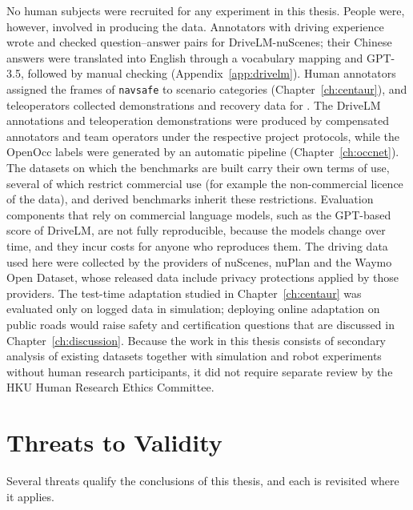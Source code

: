 No human subjects were recruited for any experiment in this thesis. People were, however, involved in producing the data. Annotators with driving experience wrote and checked question--answer pairs for DriveLM-nuScenes; their Chinese answers were translated into English through a vocabulary mapping and GPT-3.5, followed by manual checking (Appendix~\ref{app:drivelm}). Human annotators assigned the frames of \texttt{navsafe} to scenario categories (Chapter~\ref{ch:centaur}), and teleoperators collected demonstrations and recovery data for \chiz. The DriveLM annotations and \chiz teleoperation demonstrations were produced by compensated annotators and team operators under the respective project protocols, while the OpenOcc labels were generated by an automatic pipeline (Chapter~\ref{ch:occnet}). The datasets on which the benchmarks are built carry their own terms of use, several of which restrict commercial use (for example the non-commercial licence of the \chiz data), and derived benchmarks inherit these restrictions. Evaluation components that rely on commercial language models, such as the GPT-based score of DriveLM, are not fully reproducible, because the models change over time, and they incur costs for anyone who reproduces them. The driving data used here were collected by the providers of nuScenes, nuPlan and the Waymo Open Dataset, whose released data include privacy protections applied by those providers. The test-time adaptation studied in Chapter~\ref{ch:centaur} was evaluated only on logged data in simulation; deploying online adaptation on public roads would raise safety and certification questions that are discussed in Chapter~\ref{ch:discussion}. Because the work in this thesis consists of secondary analysis of existing datasets together with simulation and robot experiments without human research participants, it did not require separate review by the HKU Human Research Ethics Committee.

\section{Threats to Validity}\label{sec:method:validity}

Several threats qualify the conclusions of this thesis, and each is revisited where it applies.

